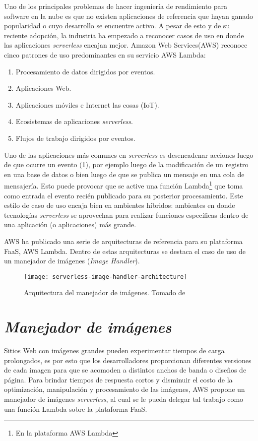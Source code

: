 Uno de los principales problemas de hacer ingeniería de rendimiento para software en la nube es que no existen aplicaciones de referencia que hayan ganado popularidad o cuyo desarrollo se encuentre activo. A pesar de esto y de su reciente adopción, la industria ha empezado a reconocer casos de uso en donde las aplicaciones \emph{serverless} encajan mejor. Amazon Web Services(AWS)\cite{serverless-architecture-patterns} reconoce cinco patrones de uso predominantes en su servicio AWS Lambda:
\begin{enumerate}
    \item Procesamiento de datos dirigidos por eventos.
    \item Aplicaciones Web.
    \item Aplicaciones móviles e Internet las cosas (IoT).
    \item Ecosistemas de aplicaciones \emph{serverless}.
    \item Flujos de trabajo dirigidos por eventos.
\end{enumerate}
 
Uno de las aplicaciones más comunes en \emph{serverless} es desencadenar acciones luego de que ocurre un evento (1), por ejemplo luego de la modificación de un registro en una base de datos o bien luego de que se publica un mensaje en una cola de mensajería. Esto puede provocar que se active una función Lambda\footnote{En la plataforma AWS Lambda } que toma como entrada el evento recién publicado para su posterior procesamiento. Este estilo de caso de uso encaja bien en ambientes híbridos: ambientes en donde tecnologías \emph{serverless} se aprovechan para realizar funciones específicas dentro de una aplicación (o aplicaciones) más grande.

AWS ha publicado una serie de arquitecturas de referencia\cite{aws-lambda-ref-arch} para su plataforma FaaS, AWS Lambda. Dentro de estas arquitecturas se destaca el caso de uso de un manejador de imágenes (\emph{Image Handler})\cite{aws-lambda-image-handler}. 

\begin{figure}[h]
  \centering
  \texttt{[image: serverless-image-handler-architecture]}
  \caption[Arquitectura del manejador de imágenes]{Arquitectura del manejador de imágenes. Tomado de \protect\cite{aws-lambda-image-handler}}
  \label{fig:serverless-image-handler-architecture}
\end{figure}

\section{\emph{Manejador de imágenes}} \label{sec:manejador-imagenes-1}
Sitios Web con imágenes grandes pueden experimentar tiempos de carga prolongados, es por esto que los desarrolladores proporcionan diferentes versiones de cada imagen para que se acomoden a distintos anchos de banda o diseños de página. Para brindar tiempos de respuesta cortos y disminuir el costo de la optimización, manipulación y procesamiento de las imágenes, AWS propone un manejador de imágenes \emph{serverless}, al cual se le pueda delegar tal trabajo como una función Lambda sobre la plataforma FaaS.


